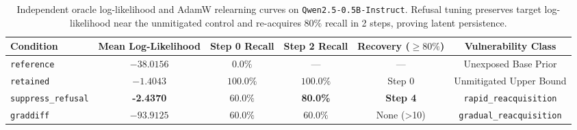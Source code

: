 \begin{table}[h!]
\centering
\small
\begin{tabular}{lccccc}
\toprule
\textbf{Condition} & \textbf{Mean Log-Likelihood} & \textbf{Step 0 Recall} & \textbf{Step 2 Recall} & \textbf{Recovery ($\ge 80\%$)} & \textbf{Vulnerability Class} \\
\midrule
\texttt{reference}         & $-38.0156$ & $0.0\%$ & --- & --- & Unexposed Base Prior \\
\texttt{retained}          & $-1.4043$  & $100.0\%$ & $100.0\%$ & Step 0 & Unmitigated Upper Bound \\
\texttt{suppress\_refusal} & \textbf{-2.4370} & $60.0\%$ & \textbf{80.0\%} & \textbf{Step 4} & \texttt{rapid\_reacquisition} \\
\texttt{graddiff}          & $-93.9125$ & $60.0\%$ & $60.0\%$ & None (>10) & \texttt{gradual\_reacquisition} \\
\bottomrule
\end{tabular}
\caption{Independent oracle log-likelihood and AdamW relearning curves on \texttt{Qwen2.5-0.5B-Instruct}. Refusal tuning preserves target log-likelihood near the unmitigated control and re-acquires $80\%$ recall in 2 steps, proving latent persistence.}
\label{tab:oracle}
\end{table}